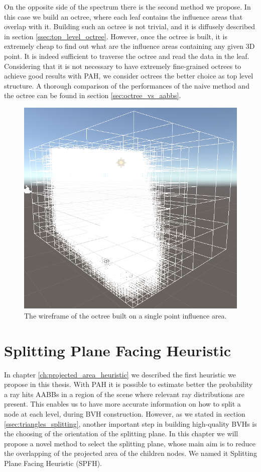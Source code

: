 \documentclass{PoliMi_MasterThesis}
\begin{document}
On the opposite side of the spectrum there is the second method we propose. In this case we build an octree, where each leaf contains the influence areas that overlap with it. Building such an octree is not trivial, and it is diffusely described in section \ref{ssec:top_level_octree}. However, once the octree is built, it is extremely cheap to find out what are the influence areas containing any given 3D point. It is indeed sufficient to traverse the octree and read the data in the leaf. Considering that it is not necessary to have extremely fine-grained octrees to achieve good results with PAH, we consider octrees the better choice as top level structure. A thorough comparison of the performances of the naive method and the octree can be found in section \ref{sec:octree_vs_aabbs}.

\begin{figure}[H]
    \centering
    \includegraphics[width=\textwidth]{Images/octree_dense_wireframe.png}
    \caption{The wireframe of the octree built on a single point influence area.}
    \label{fig:octree_dense_wireframe}
\end{figure}

\chapter{Splitting Plane Facing Heuristic} \label{ch:splitting_plane_facing_heuristic}
In chapter \ref{ch:projected_area_heuristic} we described the first heuristic we propose in this thesis. With PAH it is possible to estimate better the probability a ray hits AABBs in a region of the scene where relevant ray distributions are present. This enables us to have more accurate information on how to split a node at each level, during BVH construction. However, as we stated in section \ref{ssec:triangles_splitting}, another important step in building high-quality BVHs is the choosing of the orientation of the splitting plane. In this chapter we will propose a novel method to select the splitting plane, whose main aim is to reduce the overlapping of the projected area of the children nodes. We named it Splitting Plane Facing Heuristic (SPFH).
\end{document}
